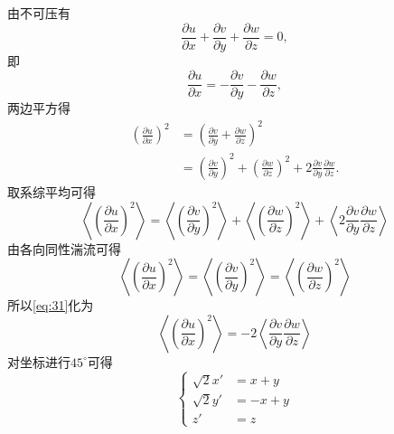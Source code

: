 \documentclass[12pt,a4]{ctexart}
\begin{document}
由不可压有
\begin{equation}
   \frac{\partial u}{\partial x} + \frac{\partial v}{\partial y} + \frac{\partial w}{\partial z} = 0,
\end{equation}
即
\begin{equation}
   \frac{\partial u}{\partial x} = - \frac{\partial v}{\partial y} - \frac{\partial w}{\partial z},
\end{equation}
两边平方得
\begin{equation}
   \begin{aligned}
      \left( \frac{\partial u}{\partial x} \right)^2 & =  \left( \frac{\partial v}{\partial y} + \frac{\partial w}{\partial z} \right)^2                                                                                   \\
                                                     & = \left( \frac{\partial v}{\partial y}  \right)^2 + \left( \frac{\partial w}{\partial z}  \right)^2 + 2\frac{\partial v}{\partial y} \frac{\partial w}{\partial z}.
   \end{aligned}
\end{equation}
取系综平均可得
\begin{equation}
   \left< \left( \frac{\partial u}{\partial x} \right)^2 \right> = \left<\left( \frac{\partial v}{\partial y}  \right)^2 \right> + \left<\left( \frac{\partial w}{\partial z}  \right)^2 \right> + \left<2\frac{\partial v}{\partial y} \frac{\partial w}{\partial z}
   \right>
   \label{eq:31}
\end{equation}
由各向同性湍流可得\cite{10.2307/96557}
\begin{equation}
   \left< \left( \frac{\partial u}{\partial x} \right)^2 \right> =\left< \left( \frac{\partial v}{\partial y} \right)^2 \right> =\left< \left( \frac{\partial w}{\partial z} \right)^2 \right>
\end{equation}
所以\cref{eq:31}化为
\begin{equation}
   \left< \left( \frac{\partial u}{\partial x} \right)^2 \right> = -2 \left<\frac{\partial v}{\partial y} \frac{\partial w}{\partial z}
   \right>
\end{equation}
对坐标进行$45^{\circ}$可得
\begin{equation}
   \begin{cases}
      \sqrt{2} x' & = x + y  \\
      \sqrt{2} y' & = -x + y \\
      z'          & = z
   \end{cases}
   \label{eq:32}
\end{equation}
\end{document}
